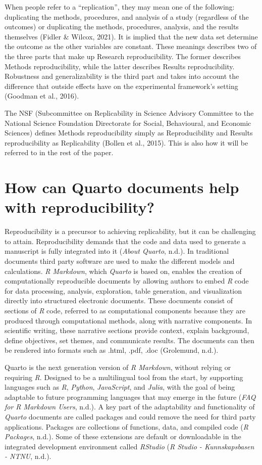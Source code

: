 \documentclass[
  a4paper,
]{article}
\begin{document}
When people refer to a ``replication'', they may mean one of the
following: duplicating the methods, procedures, and analysis of a study
(regardless of the outcomes) or duplicating the methods, procedures,
analysis, and the results themselves (Fidler \& Wilcox, 2021). It is
implied that the new data set determine the outcome as the other
variables are constant. These meanings describes two of the three parts
that make up Research reproducibility. The former describes Methods
reproducibility, while the latter describes Results reproducibility.
Robustness and generalizability is the third part and takes into account
the difference that outside effects have on the experimental framework's
setting (Goodman et al., 2016).

The NSF (Subcommittee on Replicability in Science Advisory Committee to
the National Science Foundation Directorate for Social, Behavioural, and
Economic Sciences) defines Methods reproducibility simply as
Reproducibility and Results reproducibility as Replicability (Bollen et
al., 2015). This is also how it will be referred to in the rest of the
paper.

\section{How can Quarto documents help with
reproducibility?}\label{how-can-quarto-documents-help-with-reproducibility}

Reproducibility is a precursor to achieving replicability, but it can be
challenging to attain. Reproducibility demands that the code and data
used to generate a manuscript is fully integrated into it (\emph{About
Quarto}, n.d.). In traditional documents third party software are used
to make the different models and calculations. \emph{R Markdown}, which
\emph{Quarto} is based on, enables the creation of computationally
reproducible documents by allowing authors to embed \emph{R} code for
data processing, analysis, exploration, table generation, and
visualization directly into structured electronic documents. These
documents consist of sections of \emph{R} code, referred to as
computational components because they are produced through computational
methods, along with narrative components. In scientific writing, these
narrative sections provide context, explain background, define
objectives, set themes, and communicate results. The documents can then
be rendered into formats such as .html, .pdf, .doc (Grolemund, n.d.).

Quarto is the next generation version of \emph{R Markdown}, without
relying or requiring \emph{R}. Designed to be a multilingual tool from
the start, by supporting languages such as \emph{R}, \emph{Python},
\emph{JavaScript}, and \emph{Julia}, with the goal of being adaptable to
future programming languages that may emerge in the future (\emph{FAQ
for R Markdown Users}, n.d.). A key part of the adaptability and
functionality of \emph{Quarto} documents are called packages and could
remove the need for third party applications. Packages are collections
of functions, data, and compiled code (\emph{R Packages}, n.d.). Some of
these extensions are default or downloadable in the integrated
development environment called \emph{RStudio} (\emph{R Studio -
Kunnskapsbasen - NTNU}, n.d.).
\end{document}
